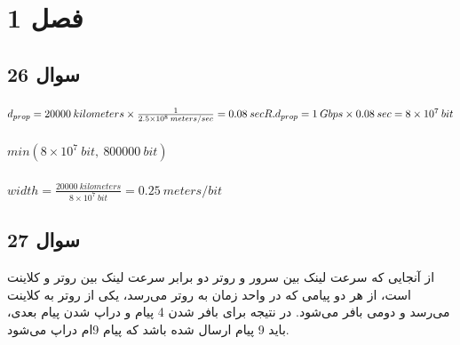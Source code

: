 \documentclass{article}
\begin{document}


\newpage

\section{فصل 1}
\subsection{سوال 26}
\subsubsection{}
\begin{latin}
$
d_{prop}=20000 \: kilometers\times \frac{1}{2.5\times 10^{8} \: meters/sec}=0.08 \: sec
\\
R.d_{prop}=1\: Gbps\times 0.08 \: sec=8\times10^{7}\: bit
$
\end{latin}
\subsubsection{}
\begin{latin}
$
min(8\times10^{7}\: bit, \: 800000\:bit)
$
\end{latin}
\subsubsection{}
\begin{latin}
$
width=\frac{20000\: kilometers}{8\times 10^{7}\: bit}=0.25\: meters/bit
$
\end{latin}

\subsection{سوال 27}
از آنجایی که سرعت لینک بین سرور و روتر دو برابر سرعت لینک بین روتر و کلاینت است، از هر دو پیامی که در واحد زمان به روتر می‌رسد، یکی از روتر به کلاینت می‌رسد و دومی بافر می‌شود. در نتیجه برای بافر شدن 4 پیام و دراپ شدن پیام بعدی، باید 9 پیام ارسال شده باشد که پیام 9ام دراپ می‌شود.
\end{document}
